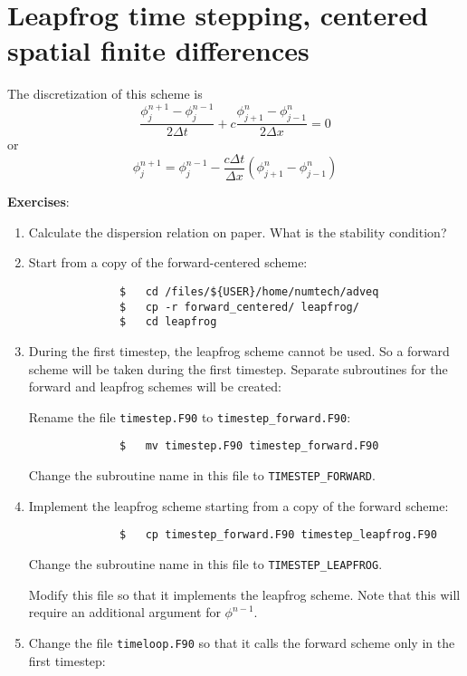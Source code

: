 \documentclass[a4paper]{article}
\begin{document}
\section{Leapfrog time stepping, centered spatial finite differences}
%
\par
The discretization of this scheme is
%
\begin{equation*}
	\frac{\phi^{n+1}_j-\phi^{n-1}_j}{2\Delta t}+c\frac{\phi^{n}_{j+1}-\phi^{n}_{j-1}}{2\Delta x}=0
\end{equation*}
%
or
%
\begin{equation*}
	\phi^{n+1}_j=\phi^{n-1}_j-\frac{c\Delta t}{\Delta x}\left(\phi^{n}_{j+1}-\phi^{n}_{j-1}\right)
\end{equation*}
%
\par\vspace*{3ex}
\textbf{Exercises}:
%
\begin{enumerate}
	\item Calculate the dispersion relation on paper. What is the stability condition?
	\item Start from a copy of the forward-centered scheme:
		\begin{verbatim}
			  $   cd /files/${USER}/home/numtech/adveq
			  $   cp -r forward_centered/ leapfrog/
			  $   cd leapfrog
		\end{verbatim}
	\item During the first timestep, the leapfrog scheme cannot be used. So a forward scheme will be taken during the first timestep. Separate subroutines for the forward and leapfrog schemes will be created:
		\par
		Rename the file \verb+timestep.F90+ to \verb+timestep_forward.F90+:
		\begin{verbatim}
			  $   mv timestep.F90 timestep_forward.F90
		\end{verbatim}
		Change the subroutine name in this file to \verb+TIMESTEP_FORWARD+.
	\item Implement the leapfrog scheme starting from a copy of the forward scheme:
		\begin{verbatim}
			  $   cp timestep_forward.F90 timestep_leapfrog.F90
		\end{verbatim}		
		Change the subroutine name in this file to \verb+TIMESTEP_LEAPFROG+.
		\par
		Modify this file so that it implements the leapfrog scheme. Note that this will require an additional argument for $\phi^{n-1}$.
	\item Change the file \verb+timeloop.F90+	so that it calls the forward scheme only in the first timestep:
	

\end{enumerate}
\end{document}
